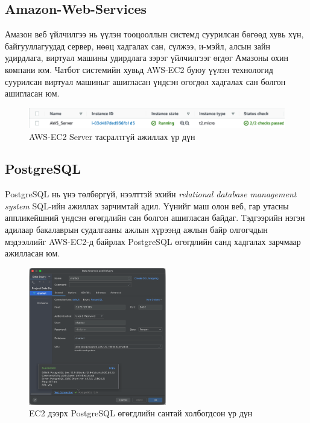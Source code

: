 \subsection{Amazon-Web-Services}
Амазон веб үйлчилгээ нь үүлэн тооцооллын системд суурилсан бөгөөд хувь хүн, байгууллагуудад сервер, нөөц хадгалах сан, сүлжээ, и-мэйл, алсын зайн удирдлага, виртуал машины удирдлага зэрэг үйлчилгээг өгдөг Амазоны охин компани юм. Чатбот системийн хувьд AWS-EC2 буюу үүлэн технологид суурилсан виртуал машиныг ашигласан үндсэн өгөгдөл хадгалах сан болгон ашигласан юм. 
\begin{figure}[ht]
  \centering
  \includegraphics[width=\textwidth]{images/aws-ec2.png}
  \caption{AWS-EC2 Server тасралтгүй ажиллах үр дүн} \label{fig:aws-ec2}
\end{figure}
\subsection{PostgreSQL}
PostgreSQL нь үнэ төлбөргүй, нээлттэй эхийн \textit{relational database management system} SQL-ийн ажиллах зарчимтай адил. Үүнийг маш олон веб, гар утасны аппликейшний үндсэн өгөгдлийн сан болгон ашигласан байдаг. Тэдгээрийн нэгэн адилаар бакалаврын судалгааны ажлын хүрээнд ажлын байр олгогчдын мэдээллийг AWS-EC2-д байрлах PostgreSQL өгөгдлийн санд хадгалах зарчмаар ажилласан юм. 
\begin{figure}[ht]
  \centering
  \includegraphics[height=6cm]{images/postgresConnection.png}
  \caption{EC2 дээрх PostgreSQL өгөгдлийн сантай холбогдсон үр дүн}\label{fig:postgresConnection}
\end{figure}
